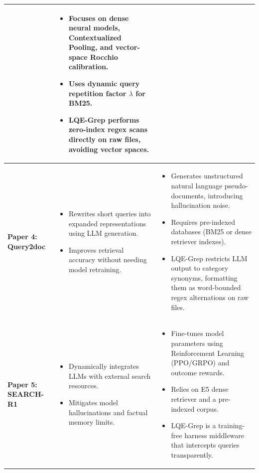 \documentclass[11pt,a4paper]{article}
\begin{document}
\begin{table}[htbp]
{\begin{tabular}{lp{6cm}p{8cm}}
\begin{itemize}
\end{itemize} & 
\begin{itemize}
    \item Focuses on dense neural models, Contextualized Pooling, and vector-space Rocchio calibration.
    \item Uses dynamic query repetition factor $\lambda$ for BM25.
    \item LQE-Grep performs zero-index regex scans directly on raw files, avoiding vector spaces.
\end{itemize} \\
\midrule
\textbf{Paper 4: Query2doc} & 
\begin{itemize}
    \item Rewrites short queries into expanded representations using LLM generation.
    \item Improves retrieval accuracy without needing model retraining.
\end{itemize} & 
\begin{itemize}
    \item Generates unstructured natural language pseudo-documents, introducing hallucination noise.
    \item Requires pre-indexed databases (BM25 or dense retriever indexes).
    \item LQE-Grep restricts LLM output to category synonyms, formatting them as word-bounded regex alternations on raw files.
\end{itemize} \\
\midrule
\textbf{Paper 5: SEARCH-R1} & 
\begin{itemize}
    \item Dynamically integrates LLMs with external search resources.
    \item Mitigates model hallucinations and factual memory limits.
\end{itemize} & 
\begin{itemize}
    \item Fine-tunes model parameters using Reinforcement Learning (PPO/GRPO) and outcome rewards.
    \item Relies on E5 dense retriever and a pre-indexed corpus.
    \item LQE-Grep is a training-free harness middleware that intercepts queries transparently.
\end{itemize} \\
\bottomrule
\end{tabular}%
}
\end{table}
\end{document}
